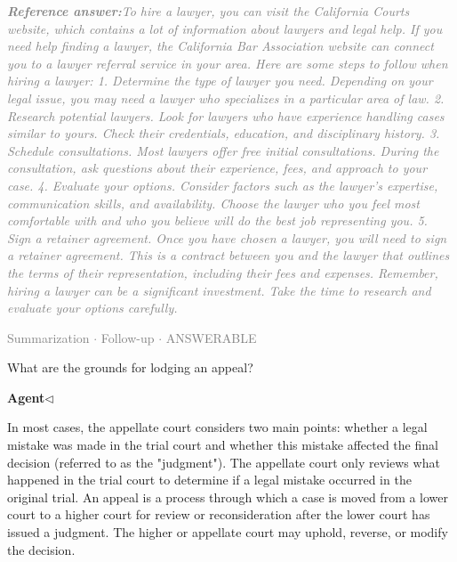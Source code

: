 \documentclass[a4paper,11pt]{article}
\begin{document}
\begin{refanswerenv}
{\footnotesize\textit{\textcolor{gray}{\textbf{Reference answer:}\enspace To hire a lawyer, you can visit the California Courts website, which contains a lot of information about lawyers and legal help. If you need help finding a lawyer, the California Bar Association website can connect you to a lawyer referral service in your area.
Here are some steps to follow when hiring a lawyer:
1. Determine the type of lawyer you need. Depending on your legal issue, you may need a lawyer who specializes in a particular area of law.
2. Research potential lawyers. Look for lawyers who have experience handling cases similar to yours. Check their credentials, education, and disciplinary history.
3. Schedule consultations. Most lawyers offer free initial consultations. During the consultation, ask questions about their experience, fees, and approach to your case.
4. Evaluate your options. Consider factors such as the lawyer's expertise, communication skills, and availability. Choose the lawyer who you feel most comfortable with and who you believe will do the best job representing you.
5. Sign a retainer agreement. Once you have chosen a lawyer, you will need to sign a retainer agreement. This is a contract between you and the lawyer that outlines the terms of their representation, including their fees and expenses.
Remember, hiring a lawyer can be a significant investment. Take the time to research and evaluate your options carefully.}}}
\end{refanswerenv}
\vspace{0.5em}
\hfill{\tiny\textcolor{gray}{Summarization $\cdot$ Follow-up $\cdot$ ANSWERABLE}}
\begin{userbubble}
What are the grounds for lodging an appeal?
\end{userbubble}
\noindent\hfill{\small\textcolor{agentcolor}{\textbf{Agent\enspace$\triangleleft$}}}
\begin{agentbubble}
In most cases, the appellate court considers two main points: whether a legal mistake was made in the trial court and whether this mistake affected the final decision (referred to as the "judgment"). The appellate court only reviews what happened in the trial court to determine if a legal mistake occurred in the original trial. An appeal is a process through which a case is moved from a lower court to a higher court for review or reconsideration after the lower court has issued a judgment. The higher or appellate court may uphold, reverse, or modify the decision.
\end{agentbubble}
\end{document}
